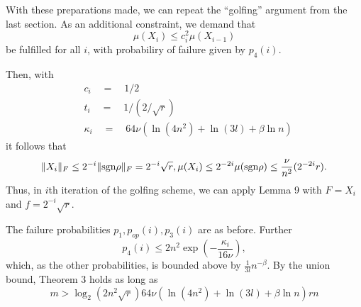 \documentclass{article}
\begin{document}
With these preparations made, we can repeat the ``golfing'' argument from the last section. As an additional constraint, we demand that
\[
\mu(X_i) \le c_i^2\mu(X_{i-1})
\]
be fulfilled for all $i$, with probabiliry of failure given by $p_4(i)$.

Then, with
\begin{align*}
& c_i\quad =\quad 1/2\\
& t_i\quad =\quad 1/(2/\sqrt{r})\\
& \kappa_i\quad = \quad 64\nu(\ln(4n^2)+\ln(3l)+\beta \ln n)
\end{align*}
it follows that
\[
\|X_i\|_F \le 2^{-i}\|\text{sgn} \rho\|_F = 2^{-i}\sqrt{r},\\
\mu(X_i) \le 2^{-2i}\mu(\text{sgn} \rho) \le \frac{\nu}{n^2}(2^{-2i}r).
\]
Thus, in $i$th iteration of the golfing scheme, we can apply Lemma 9 with $F = X_i$ and $f = 2^{-i}\sqrt{r}$.

The failure probabilities $p_1,p_{op}(i),p_3(i)$ are as before. Further
\[
p_4(i) \le 2n^2 \exp\left( -\frac{\kappa_i}{16\nu} \right),
\]
which, as the other probabilities, is bounded above by $\frac{1}{3l}n^{-\beta}$. By the union bound, Theorem 3 holds as long as 
\[
m > \log_2(2n^2\sqrt{r}) 64\nu(\ln(4n^2)+\ln(3l)+\beta\ln n) rn
\]
\end{document}
